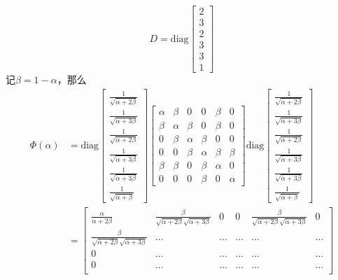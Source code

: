 \documentclass[11pt]{article}
\begin{document}
\begin{enumerate}
\[D=\text{diag}\begin{bmatrix}
2\\
3\\
2\\
3\\
3\\
1
\end{bmatrix}
\]记$\beta=1-\alpha$，那么\[
\begin{split}
\Phi(\alpha)&=
\text{diag}\begin{bmatrix}
\frac{1}{\sqrt{\alpha+2\beta}}\\
\frac{1}{\sqrt{\alpha+3\beta}}\\
\frac{1}{\sqrt{\alpha+2\beta}}\\
\frac{1}{\sqrt{\alpha+3\beta}}\\
\frac{1}{\sqrt{\alpha+3\beta}}\\
\frac{1}{\sqrt{\alpha+\beta}}
\end{bmatrix}
\begin{bmatrix}
  \alpha &  \beta &  0 &  0 &  \beta &  0\\
  \beta &  \alpha &  \beta &  0 &  \beta &  0\\
  0 &  \beta &  \alpha &  \beta &  0 &  0\\
  0 &  0 &  \beta &  \alpha &  \beta &  \beta\\
  \beta &  \beta &  0 &  \beta &  \alpha &  0\\
  0 &  0 &  0 &  \beta &  0 &  \alpha
\end{bmatrix}
\text{diag}\begin{bmatrix}
\frac{1}{\sqrt{\alpha+2\beta}}\\
\frac{1}{\sqrt{\alpha+3\beta}}\\
\frac{1}{\sqrt{\alpha+2\beta}}\\
\frac{1}{\sqrt{\alpha+3\beta}}\\
\frac{1}{\sqrt{\alpha+3\beta}}\\
\frac{1}{\sqrt{\alpha+\beta}}
\end{bmatrix}\\
&=\begin{bmatrix}
\frac{\alpha}{\alpha+2\beta}&\frac{\beta}{\sqrt{\alpha+2\beta}\sqrt{\alpha+3\beta}}&0&0&\frac{\beta}{\sqrt{\alpha+2\beta}\sqrt{\alpha+3\beta}}&0\\
\frac{\beta}{\sqrt{\alpha+2\beta}\sqrt{\alpha+3\beta}}&\dots&\dots&\dots&\dots&\dots\\
0&\dots&\dots&\dots&\dots&\dots\\
0&\dots&\dots&\dots&\dots&\dots\\

\end{bmatrix}
\end{split}\]
\end{enumerate}
\end{document}
